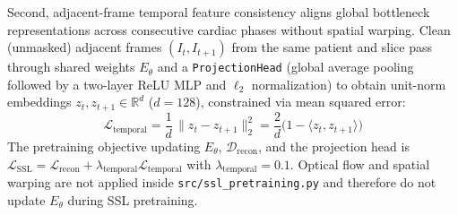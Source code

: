 \documentclass[pdflatex,sn-mathphys]{sn-jnl}
\theoremstyle{thmstyleone}
\theoremstyle{thmstyletwo}
\theoremstyle{thmstylethree}
\begin{document}
Second, adjacent-frame temporal feature consistency aligns global bottleneck representations across consecutive cardiac phases without spatial warping. Clean (unmasked) adjacent frames $(I_t, I_{t+1})$ from the same patient and slice pass through shared weights $E_\theta$ and a \texttt{ProjectionHead} (global average pooling followed by a two-layer ReLU MLP and $\ell_2$ normalization) to obtain unit-norm embeddings $z_t, z_{t+1} \in \mathbb{R}^{d}$ ($d = 128$), constrained via mean squared error:
\begin{equation}
\mathcal{L}_{\text{temporal}} = \frac{1}{d}\,\bigl\|z_t - z_{t+1}\bigr\|_2^2 = \frac{2}{d}\bigl(1 - \langle z_t, z_{t+1} \rangle\bigr)
\label{eq:temporal}
\end{equation}
The pretraining objective updating $E_\theta$, $\mathcal{D}_{\text{recon}}$, and the projection head is $\mathcal{L}_{\text{SSL}} = \mathcal{L}_{\text{recon}} + \lambda_{\text{temporal}} \mathcal{L}_{\text{temporal}}$ with $\lambda_{\text{temporal}} = 0.1$. Optical flow and spatial warping are not applied inside \texttt{src/ssl\_pretraining.py} and therefore do not update $E_\theta$ during SSL pretraining.
\end{document}
